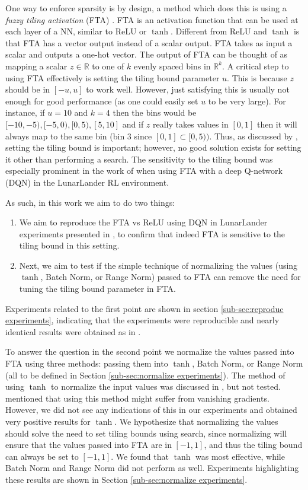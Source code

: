 \documentclass{article}
\newcommand{\RR}{\mathbb{R}}
\begin{document}
One way to enforce sparsity is by design, a method which does this is using a \textit{fuzzy tiling activation} (FTA) \cite[]{pan2019fuzzy}.
FTA is an activation function that can be used at each layer of a NN, similar to ReLU or $\tanh$.
Different from ReLU and $\tanh$ is that FTA has a vector output instead of a scalar output.
FTA takes as input a scalar and outputs a one-hot vector.
The output of FTA can be thought of as mapping a scalar $z \in \RR$ to one of $k$ evenly spaced bins in $\RR^k$.
A critical step to using FTA effectively is setting the tiling bound parameter $u$.
This is because $z$ should be in $[-u, u]$ to work well.
However, just satisfying this is usually not enough for good performance (as one could easily set $u$ to be very large).
For instance, if $u = 10$ and $k = 4$ then the bins would be $[-10, -5), [-5, 0), [0, 5), [5, 10]$
and if $z$ really takes values in $[0,1]$ then it will always map to the same bin (bin $3$ since $[0, 1] \subset [0, 5))$.
Thus, as discussed by \cite[]{pan2019fuzzy}, setting the tiling bound is important; however, no good solution exists for setting it other than performing a search.
The sensitivity to the tiling bound was especially prominent in the work of \cite[]{pan2019fuzzy} when using FTA with a deep Q-network (DQN) \cite[]{mnih2013playing} in the LunarLander RL environment.

As such, in this work we aim to do two things:
\begin{enumerate}
  \item We aim to reproduce the FTA vs ReLU using DQN in LunarLander experiments presented in \cite[]{pan2019fuzzy}, to confirm that indeed FTA is sensitive to the tiling bound in this setting.
  \item Next, we aim to test if the simple technique of normalizing the values (using $\tanh$, Batch Norm, or Range Norm) passed to FTA can remove the need for tuning the tiling bound parameter in FTA.
\end{enumerate}

Experiments related to the first point are shown in section \ref{sub-sec:reproduc experiments}, indicating that the experiments were reproducible and nearly identical results were obtained as in \cite[]{pan2019fuzzy}.

To answer the question in the second point we normalize the values passed into FTA using three methods: passing them into $\tanh$, Batch Norm, or Range Norm (all to be defined in Section \ref{sub-sec:normalize experiments}).
The method of using $\tanh$ to normalize the input values was discussed in \cite{pan2019fuzzy}, but not tested.
\cite{pan2019fuzzy} mentioned that using this method might suffer from vanishing gradients. However, we did not see any indications of this in our experiments and obtained very positive results for $\tanh$.
We hypothesize that normalizing the values should solve the need to set tiling bounds using search, since normalizing will ensure that the values passed into FTA are in $[-1, 1]$, and thus the tiling bound can always be set to $[-1, 1]$.
We found that $\tanh$ was most effective, while Batch Norm and Range Norm did not perform as well.
Experiments highlighting these results are shown in Section \ref{sub-sec:normalize experiments}.
\end{document}
